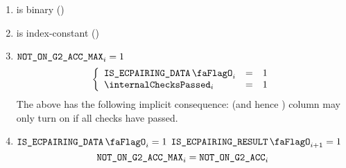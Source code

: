 \begin{enumerate}[resume]
    \item \notOnGTwoAccMax{} is binary \quad (\trash)
    \item \notOnGTwoAccMax{} is index-constant \quad (\trash)
    \item \If $\texttt{NOT\_ON\_G2\_ACC\_MAX}_{i} = 1$ \Then
          \[
              \left\{ \begin{array}{lcl}
                  \isEcpairingData      _{i} & = & 1 \\
                  \internalChecksPassed _{i} & = & 1 \\
              \end{array} \right.
          \]
          \saNote{} The above has the following implicit consequence: \notOnGTwoAcc{} (and hence \notOnGTwo{}) column may only turn on if all checks have passed.
    \item \If $\isEcpairingData _{i} = 1$ \et $\isEcpairingResult _{i + 1} = 1$ \Then
          \[
              \texttt{NOT\_ON\_G2\_ACC\_MAX}_{i} = \texttt{NOT\_ON\_G2\_ACC} _{i}
          \]
\end{enumerate}
